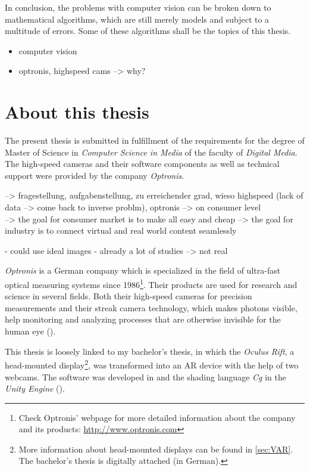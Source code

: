 In conclusion, the problems with computer vision can be broken down to mathematical algorithms, which are still merely models and subject to a multitude of errors. Some of these algorithms shall be the topics of this thesis.  
 
\begin{itemize}
\item computer vision 

\item optronis, highspeed cams --> why?
\end{itemize}
 
\section{About this thesis}
The present thesis is submitted in fulfillment of the requirements for the degree of Master of Science in \textit{Computer Science in Media} of the faculty of \textit{Digital Media}. The high-speed cameras and their software components as well as technical support were provided by the company \textit{Optronis}.

--> fragestellung, aufgabenstellung, zu erreichender grad, wieso highspeed (lack of data --> come back to inverse problm), optronis --> on consumer level \\
--> the goal for consumer market is to make all easy and cheap 
--> the goal for industry is to connect virtual and real world content seamlessly  

- could use ideal images - already a lot of studies --> not real

\textit{Optronis} is a German company which is specialized in the field of ultra-fast optical measuring systems since 1986\footnote{Check Optronis' webpage for more detailed information about the company and its products: \url{http://www.optronis.com}}. Their products are used for research and science in several fields. Both their high-speed cameras for precision measurements and their streak camera technology, which makes photons visible, help monitoring and analyzing processes that are otherwise invisible for the human eye (\cite{Optronis.2016}).

This thesis is loosely linked to my bachelor's thesis, in which the \textit{Oculus Rift}, a head-mounted display\footnote{More information about head-mounted displays can be found in \autoref{sec:VAR}. The  bachelor's thesis is digitally attached (in German).}, was transformed into an AR device with the help of two webcams. The software was developed in \CS and the shading language \textit{Cg} in the \textit{Unity Engine} (\cite{Haefele.2014}).     

